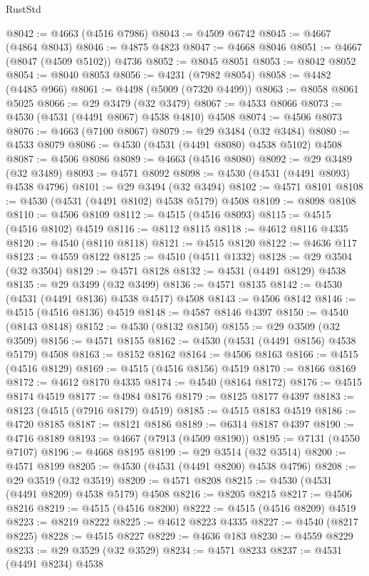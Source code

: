 \begin{lexlean}{RustStd}
\begin{coremodule}
@8042 := @4663 (@4516 @7986)
@8043 := @4509 @6742
@8045 := @4667 (@4864 @8043)
@8046 := @4875 @4823
@8047 := @4668 @8046
@8051 := @4667 (@8047 (@4509 @5102)) @4736
@8052 := @8045 @8051
@8053 := @8042 @8052
@8054 := @8040 @8053
@8056 := @4231 (@7982 @8054)
@8058 := @4482 (@4485 @966)
@8061 := @4498 (@5009 (@7320 @4499))
@8063 := @8058 @8061 @5025
@8066 := @29 @3479 (@32 @3479)
@8067 := @4533 @8066
@8073 := @4530 (@4531 (@4491 @8067) @4538 @4810) @4508
@8074 := @4506 @8073
@8076 := @4663 (@7100 @8067)
@8079 := @29 @3484 (@32 @3484)
@8080 := @4533 @8079
@8086 := @4530 (@4531 (@4491 @8080) @4538 @5102) @4508
@8087 := @4506 @8086
@8089 := @4663 (@4516 @8080)
@8092 := @29 @3489 (@32 @3489)
@8093 := @4571 @8092
@8098 := @4530 (@4531 (@4491 @8093) @4538 @4796)
@8101 := @29 @3494 (@32 @3494)
@8102 := @4571 @8101
@8108 := @4530 (@4531 (@4491 @8102) @4538 @5179) @4508
@8109 := @8098 @8108
@8110 := @4506 @8109
@8112 := @4515 (@4516 @8093)
@8115 := @4515 (@4516 @8102) @4519
@8116 := @8112 @8115
@8118 := @4612 @8116 @4335
@8120 := @4540 (@8110 @8118)
@8121 := @4515 @8120
@8122 := @4636 @117
@8123 := @4559 @8122
@8125 := @4510 (@4511 @1332)
@8128 := @29 @3504 (@32 @3504)
@8129 := @4571 @8128
@8132 := @4531 (@4491 @8129) @4538
@8135 := @29 @3499 (@32 @3499)
@8136 := @4571 @8135
@8142 := @4530 (@4531 (@4491 @8136) @4538 @4517) @4508
@8143 := @4506 @8142
@8146 := @4515 (@4516 @8136) @4519
@8148 := @4587 @8146 @4397
@8150 := @4540 (@8143 @8148)
@8152 := @4530 (@8132 @8150)
@8155 := @29 @3509 (@32 @3509)
@8156 := @4571 @8155
@8162 := @4530 (@4531 (@4491 @8156) @4538 @5179) @4508
@8163 := @8152 @8162
@8164 := @4506 @8163
@8166 := @4515 (@4516 @8129)
@8169 := @4515 (@4516 @8156) @4519
@8170 := @8166 @8169
@8172 := @4612 @8170 @4335
@8174 := @4540 (@8164 @8172)
@8176 := @4515 @8174 @4519
@8177 := @4984 @8176
@8179 := @8125 @8177 @4397
@8183 := @8123 (@4515 (@7916 @8179) @4519)
@8185 := @4515 @8183 @4519
@8186 := @4720 @8185
@8187 := @8121 @8186
@8189 := @6314 @8187 @4397
@8190 := @4716 @8189
@8193 := @4667 (@7913 (@4509 @8190))
@8195 := @7131 (@4550 @7107)
@8196 := @4668 @8195
@8199 := @29 @3514 (@32 @3514)
@8200 := @4571 @8199
@8205 := @4530 (@4531 (@4491 @8200) @4538 @4796)
@8208 := @29 @3519 (@32 @3519)
@8209 := @4571 @8208
@8215 := @4530 (@4531 (@4491 @8209) @4538 @5179) @4508
@8216 := @8205 @8215
@8217 := @4506 @8216
@8219 := @4515 (@4516 @8200)
@8222 := @4515 (@4516 @8209) @4519
@8223 := @8219 @8222
@8225 := @4612 @8223 @4335
@8227 := @4540 (@8217 @8225)
@8228 := @4515 @8227
@8229 := @4636 @183
@8230 := @4559 @8229
@8233 := @29 @3529 (@32 @3529)
@8234 := @4571 @8233
@8237 := @4531 (@4491 @8234) @4538

\end{coremodule}
\end{lexlean}
